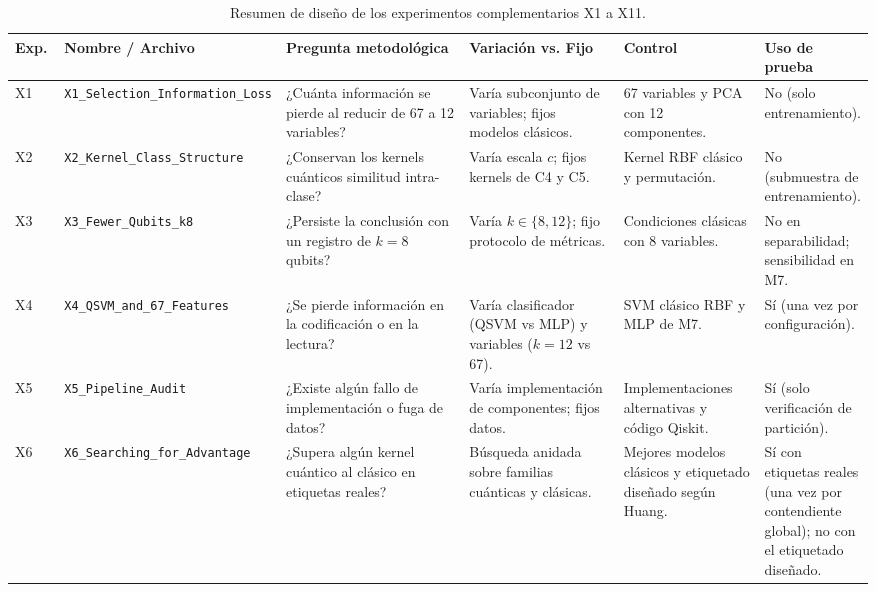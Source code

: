 \begin{table}[htbp]
\centering
\small
\caption{Resumen de diseño de los experimentos complementarios X1 a X11.}
\label{tab:resumen_experimentos_complementarios}
\begin{adjustbox}{max width=\linewidth}
\begin{tabular}{p{0.06\linewidth} p{0.22\linewidth} p{0.28\linewidth} p{0.22\linewidth} p{0.18\linewidth} p{0.14\linewidth}}
\toprule
\textbf{Exp.} & \textbf{Nombre / Archivo} & \textbf{Pregunta metodológica} & \textbf{Variación vs. Fijo} & \textbf{Control} & \textbf{Uso de prueba} \\
\midrule
X1 & \texttt{X1\_Selection\_}\allowbreak\texttt{Information\_Loss} & ¿Cuánta información se pierde al reducir de 67 a 12 variables? & Varía subconjunto de variables; fijos modelos clásicos. & 67 variables y PCA con 12 componentes. & No (solo entrenamiento). \\
X2 & \texttt{X2\_Kernel\_}\allowbreak\texttt{Class\_Structure} & ¿Conservan los kernels cuánticos similitud intra-clase? & Varía escala $c$; fijos kernels de C4 y C5. & Kernel RBF clásico y permutación. & No (submuestra de entrenamiento). \\
X3 & \texttt{X3\_Fewer\_Qubits\_}\allowbreak\texttt{k8} & ¿Persiste la conclusión con un registro de $k = 8$ qubits? & Varía $k \in \{8, 12\}$; fijo protocolo de métricas. & Condiciones clásicas con 8 variables. & No en separabilidad; sensibilidad en M7. \\
X4 & \texttt{X4\_QSVM\_and\_}\allowbreak\texttt{67\_Features} & ¿Se pierde información en la codificación o en la lectura? & Varía clasificador (QSVM vs MLP) y variables ($k=12$ vs 67). & SVM clásico RBF y MLP de M7. & Sí (una vez por configuración). \\
X5 & \texttt{X5\_Pipeline\_}\allowbreak\texttt{Audit} & ¿Existe algún fallo de implementación o fuga de datos? & Varía implementación de componentes; fijos datos. & Implementaciones alternativas y código Qiskit. & Sí (solo verificación de partición). \\
X6 & \texttt{X6\_Searching\_}\allowbreak\texttt{for\_Advantage} & ¿Supera algún kernel cuántico al clásico en etiquetas reales? & Búsqueda anidada sobre familias cuánticas y clásicas. & Mejores modelos clásicos y etiquetado diseñado según Huang. & Sí con etiquetas reales (una vez por contendiente global); no con el etiquetado diseñado. \\

\end{tabular}
\end{adjustbox}
\end{table}
